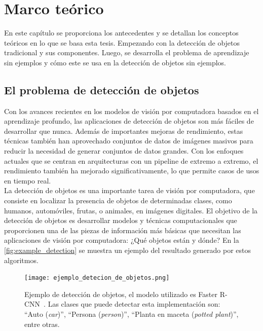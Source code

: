 \chapter{Marco teórico}\label{cap:marcoteorico}

En este capítulo se proporciona los antecedentes y se detallan los conceptos teóricos en lo que se basa esta tesis. Empezando con la detección de objetos tradicional y sus componentes. Luego, se desarrolla el problema de aprendizaje sin ejemplos y cómo este se usa en la detección de objetos sin ejemplos. 

\section{El problema de detección de objetos} \label{sec:elproblemadedetcciondeobjetos}
Con los avances recientes en los modelos de visión por computadora basados en el aprendizaje profundo, las aplicaciones de detección de objetos son más fáciles de desarrollar que nunca. Además de importantes mejoras de rendimiento, estas técnicas también han aprovechado conjuntos de datos de imágenes masivos para reducir la necesidad de generar conjuntos de datos grandes. Con los enfoques actuales que se centran en arquitecturas con un pipeline de extremo a extremo, el rendimiento también ha mejorado significativamente, lo que permite casos de usos en tiempo real.\\


La detección de objetos es una importante tarea de visión por computadora, que consiste en localizar la presencia de objetos de determinadas clases, como humanos, automóviles, frutas, o animales, en imágenes digitales. El objetivo de la detección de objetos es desarrollar modelos y técnicas computacionales que proporcionen una de las piezas de información más básicas que necesitan las aplicaciones de visión por computadora: ¿Qué objetos están y dónde? En la \autoref{fig:example_detection} se muestra un ejemplo del resultado generado por estos algoritmos.\\

\begin{figure}
	\centering
	\texttt{[image: ejemplo\_detecion\_de\_objetos.png]}
	\caption{Ejemplo de detección de objetos, el modelo utilizado es Faster R-CNN~\cite{ren2015faster}. Las clases que puede detectar esta implementación son: ``Auto (\textit{car})'',  ``Persona (\textit{person})'',  ``Planta en maceta (\textit{potted plant})'', entre otras.}
	\label{fig:example_detection}
\end{figure}

